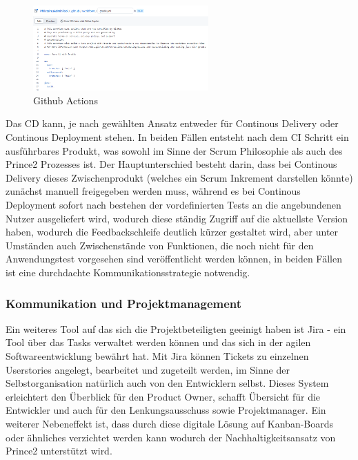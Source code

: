 \begin{figure}[!h]
\centering
\includegraphics[width=0.6\textwidth]{githubactions}
\caption{Github Actions}
\end{figure}

Das CD kann, je nach gewählten Ansatz entweder für Continous Delivery oder Continous Deployment stehen. In beiden Fällen entsteht nach dem CI Schritt ein ausführbares Produkt, was sowohl im Sinne der Scrum Philosophie als auch des Prince2 Prozesses ist. Der Hauptunterschied besteht darin, dass bei Continous Delivery dieses Zwischenprodukt (welches ein Scrum Inkrement darstellen könnte) zunächst manuell freigegeben werden muss, während es bei Continous Deployment sofort nach bestehen der vordefinierten Tests an die angebundenen Nutzer ausgeliefert wird, wodurch diese ständig Zugriff auf die aktuellste Version haben, wodurch die Feedbackschleife deutlich kürzer gestaltet wird, aber unter Umständen auch Zwischenstände von Funktionen, die noch nicht für den Anwendungstest vorgesehen sind veröffentlicht werden können, in beiden Fällen ist eine durchdachte Kommunikationsstrategie notwendig.


\subsubsection{Kommunikation und Projektmanagement}

Ein weiteres Tool auf das sich die Projektbeteiligten geeinigt haben ist Jira \cite{jira} - ein Tool über das Tasks verwaltet werden können und das sich in der agilen Softwareentwicklung bewährt hat. Mit Jira können Tickets zu einzelnen Userstories angelegt, bearbeitet und zugeteilt werden, im Sinne der Selbstorganisation natürlich auch von den Entwicklern selbst. Dieses System erleichtert den Überblick für den Product Owner, schafft Übersicht für die Entwickler und auch für den Lenkungsausschuss sowie Projektmanager. Ein weiterer Nebeneffekt ist, dass durch diese digitale Lösung auf Kanban-Boards oder ähnliches verzichtet werden kann wodurch der Nachhaltigkeitsansatz von Prince2 unterstützt wird.\\

